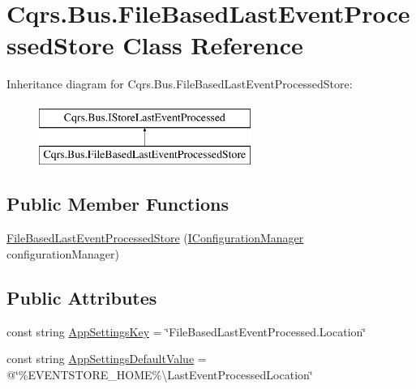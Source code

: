 \hypertarget{classCqrs_1_1Bus_1_1FileBasedLastEventProcessedStore}{}\section{Cqrs.\+Bus.\+File\+Based\+Last\+Event\+Processed\+Store Class Reference}
\label{classCqrs_1_1Bus_1_1FileBasedLastEventProcessedStore}
Inheritance diagram for Cqrs.\+Bus.\+File\+Based\+Last\+Event\+Processed\+Store\+:\begin{figure}[H]
\begin{center}
\leavevmode
\includegraphics[height=2.000000cm]{classCqrs_1_1Bus_1_1FileBasedLastEventProcessedStore}
\end{center}
\end{figure}
\subsection*{Public Member Functions}
\begin{DoxyCompactItemize}
\item 
\hyperlink{classCqrs_1_1Bus_1_1FileBasedLastEventProcessedStore_a9e7f5bb54ffc9970f57e1712e9008e8a}{File\+Based\+Last\+Event\+Processed\+Store} (\hyperlink{interfaceCqrs_1_1Configuration_1_1IConfigurationManager}{I\+Configuration\+Manager} configuration\+Manager)
\end{DoxyCompactItemize}
\subsection*{Public Attributes}
\begin{DoxyCompactItemize}
\item 
const string \hyperlink{classCqrs_1_1Bus_1_1FileBasedLastEventProcessedStore_ab7387488772c28f22cfb276f4f0b3adb}{App\+Settings\+Key} = \char`\"{}File\+Based\+Last\+Event\+Processed.\+Location\char`\"{}
\item 
const string \hyperlink{classCqrs_1_1Bus_1_1FileBasedLastEventProcessedStore_ab72de68ea94158dfa1c00ea697d84968}{App\+Settings\+Default\+Value} = @\char`\"{}\%E\+V\+E\+N\+T\+S\+T\+O\+R\+E\+\_\+\+H\+O\+ME\%\textbackslash{}Last\+Event\+Processed\+Location\char`\"{}
\end{DoxyCompactItemize}
